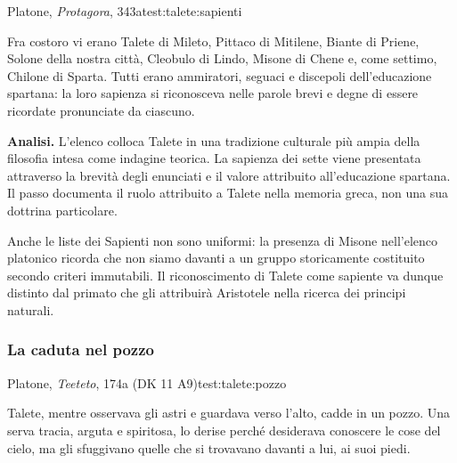 \begin{testimonianza}{Platone, \emph{Protagora}, 343a}{test:talete:sapienti}
\smallskip
{}\par
Fra costoro vi erano Talete di Mileto, Pittaco di Mitilene, Biante di Priene, Solone della nostra città, Cleobulo di Lindo, Misone di Chene e, come settimo, Chilone di Sparta. Tutti erano ammiratori, seguaci e discepoli dell'educazione spartana: la loro sapienza si riconosceva nelle parole brevi e degne di essere ricordate pronunciate da ciascuno.
\end{testimonianza}



\noindent\textbf{Analisi.}
L'elenco colloca Talete in una tradizione culturale più ampia della filosofia intesa come indagine teorica. La sapienza dei sette viene presentata attraverso la brevità degli enunciati e il valore attribuito all'educazione spartana. Il passo documenta il ruolo attribuito a Talete nella memoria greca, non una sua dottrina particolare.

Anche le liste dei Sapienti non sono uniformi: la presenza di Misone nell'elenco platonico ricorda che non siamo davanti a un gruppo storicamente costituito secondo criteri immutabili. Il riconoscimento di Talete come sapiente va dunque distinto dal primato che gli attribuirà Aristotele nella ricerca dei principi naturali.

\subsubsection{La caduta nel pozzo}

\begin{testimonianza}{Platone, \emph{Teeteto}, 174a (DK 11 A9)}{test:talete:pozzo}
\smallskip
{}\par
Talete, mentre osservava gli astri e guardava verso l'alto, cadde in un pozzo. Una serva tracia, arguta e spiritosa, lo derise perché desiderava conoscere le cose del cielo, ma gli sfuggivano quelle che si trovavano davanti a lui, ai suoi piedi.
\end{testimonianza}

